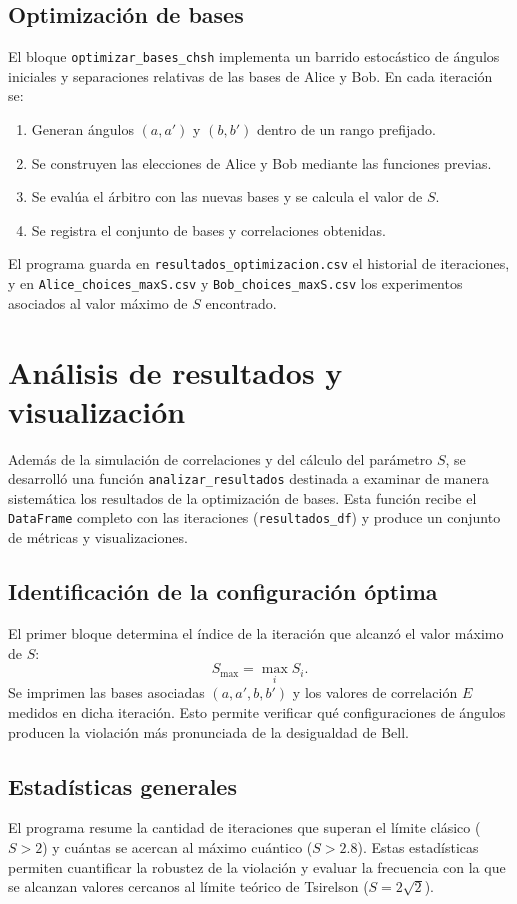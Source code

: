 \documentclass[11pt]{article}
\begin{document}
\subsection{Optimización de bases}

El bloque \texttt{optimizar\_bases\_chsh} implementa un barrido estocástico de ángulos iniciales y separaciones relativas de las bases de Alice y Bob. En cada iteración se:
\begin{enumerate}
\item Generan ángulos $(a,a')$ y $(b,b')$ dentro de un rango prefijado.
\item Se construyen las elecciones de Alice y Bob mediante las funciones previas.
\item Se evalúa el árbitro con las nuevas bases y se calcula el valor de $S$.
\item Se registra el conjunto de bases y correlaciones obtenidas.
\end{enumerate}

El programa guarda en \texttt{resultados\_optimizacion.csv} el historial de iteraciones, y en \texttt{Alice\_choices\_maxS.csv} y \texttt{Bob\_choices\_maxS.csv} los experimentos asociados al valor máximo de $S$ encontrado.



\section{Análisis de resultados y visualización}

Además de la simulación de correlaciones y del cálculo del parámetro $S$, se desarrolló una función \texttt{analizar\_resultados} destinada a examinar de manera sistemática los resultados de la optimización de bases. Esta función recibe el \texttt{DataFrame} completo con las iteraciones (\texttt{resultados\_df}) y produce un conjunto de métricas y visualizaciones. 

\subsection{Identificación de la configuración óptima}
El primer bloque determina el índice de la iteración que alcanzó el valor máximo de $S$:
\[
S_{\text{max}} = \max_i S_i.
\]
Se imprimen las bases asociadas $(a,a',b,b')$ y los valores de correlación $E$ medidos en dicha iteración. Esto permite verificar qué configuraciones de ángulos producen la violación más pronunciada de la desigualdad de Bell.

\subsection{ Estadísticas generales}
El programa resume la cantidad de iteraciones que superan el límite clásico ($S>2$) y cuántas se acercan al máximo cuántico ($S>2.8$). Estas estadísticas permiten cuantificar la robustez de la violación y evaluar la frecuencia con la que se alcanzan valores cercanos al límite teórico de Tsirelson ($S=2\sqrt{2}$).
\end{document}
